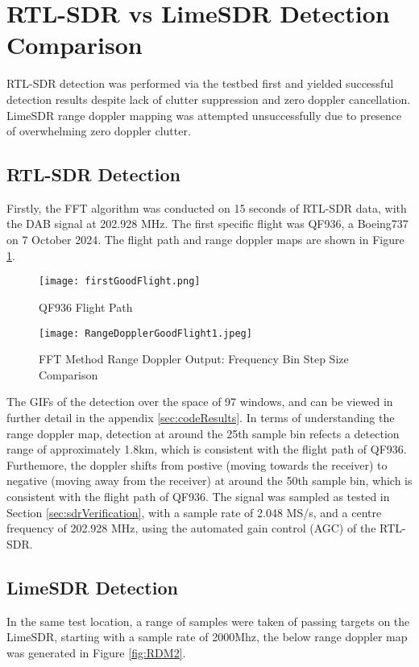 \section{RTL-SDR vs LimeSDR Detection Comparison \label{sec:SDRcomparison}}
RTL-SDR detection was performed via the testbed first and yielded successful detection results despite lack of clutter suppression and zero doppler cancellation. LimeSDR range doppler mapping was attempted unsuccessfully due to presence of overwhelming zero doppler clutter. 

\subsection*{RTL-SDR Detection}
Firstly, the FFT algorithm was conducted on 15 seconds of RTL-SDR data, with the DAB signal at 202.928 MHz. The first specific flight was QF936, a Boeing737 on 7 October 2024. The flight path and range doppler maps are shown in Figure \ref{fig:QF936}.

\begin{figure}[h!]
    \centering
    \texttt{[image: firstGoodFlight.png]}
    \caption{QF936 Flight Path \cite{flightradar24}}
    \label{fig:QF936}
\end{figure}

\begin{figure}[h!]
    \centering
    \texttt{[image: RangeDopplerGoodFlight1.jpeg]}
    \caption{FFT Method Range Doppler Output: Frequency Bin Step Size Comparison}
    \label{fig:RDM1}
\end{figure}

The GIFs of the detection over the space of 97 windows, and can be viewed in further detail in the appendix \ref{sec:codeResults}. In terms of understanding the range doppler map, detection at around the 25th sample bin refects a detection range of approximately 1.8km, which is consistent with the flight path of QF936. Furthemore, the doppler shifts from postive (moving towards the receiver) to negative (moving away from the receiver) at around the 50th sample bin, which is consistent with the flight path of QF936. The signal was sampled as tested in Section \ref{sec:sdrVerification}, with a sample rate of 2.048 MS/s, and a centre frequency of 202.928 MHz, using the automated gain control (AGC) of the RTL-SDR.

\subsection*{LimeSDR Detection}
In the same test location, a range of samples were taken of passing targets on the LimeSDR, starting with a sample rate of 2000Mhz, the below range doppler map was generated in Figure \ref{fig:RDM2}. 


